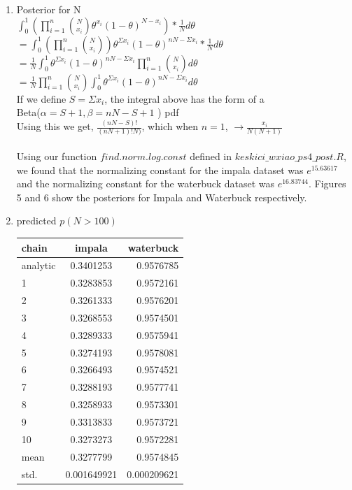 \documentclass[paper=a4, fontsize=11pt]{scrartcl}
\newcommand{\parens}[1]{ \left( #1 \right) }
\begin{document}
\begin{enumerate}
\begin{enumerate}[1]
	\item Posterior for N\\
	$\int^1_0 \parens{\prod_{i=1}^n\binom{N}{x_i}\theta^{x_i}(1-\theta)^{N - x_i}}* \frac{1}{N} d\theta$\\
	$=\int^1_0 \parens{\prod_{i=1}^n\binom{N}{x_i}}\theta^{\Sigma x_i}(1-\theta)^{nN - \Sigma x_i}* \frac{1}{N} d\theta$\\
	$= \frac{1}{N} \int^1_0 \theta^{\Sigma x_i}(1-\theta)^{nN - \Sigma x_i}\prod_{i=1}^n\binom{N}{x_i} d\theta$\\
	$= \frac{1}{N} \prod_{i=1}^n\binom{N}{x_i}  \int^1_0 \theta^{\Sigma x_i}(1-\theta)^{nN - \Sigma x_i}d\theta$\\
	If we define $S = \Sigma x_i$, the integral above has the form of a\\ 
	Beta($\alpha=S+1, \beta=nN - S + 1$ ) pdf\\
	Using this we get, $\frac{(nN-S)!}{(nN + 1)!N)}$, which when $n=1$, $\rightarrow \frac{x_i}{N(N+1)}$\\\\
	Using our function $find.norm.log.const$ defined in $keskici\_wxiao\_ps4\_post.R$, we found that the normalizing constant for the impala dataset was $e^{15.63617}$ and the normalizing constant for the waterbuck dataset was $e^{16.83744}$. Figures 5 and 6 show the posteriors for Impala and Waterbuck respectively.
	
  \item predicted $p(N > 100)$ \\
    \begin{center}
      \begin{tabular}{ l | c || r }
        chain & impala & waterbuck \\
        \hline
        analytic & 0.3401253 & 0.9576785 \\ \hline
        1 & 0.3283853 & 0.9572161 \\
        2 & 0.3261333 & 0.9576201 \\
        3 & 0.3268553 & 0.9574501 \\
        4 & 0.3289333 & 0.9575941 \\
        5 & 0.3274193 & 0.9578081 \\
        6 & 0.3266493 & 0.9574521 \\
        7 & 0.3288193 & 0.9577741 \\
        8 & 0.3258933 & 0.9573301 \\
        9 & 0.3313833 & 0.9573721 \\
        10 & 0.3273273 & 0.9572281 \\ \hline
        mean & 0.3277799 & 0.9574845 \\
        std. & 0.001649921 & 0.000209621
      \end{tabular}
    \end{center}


\end{enumerate}
\end{enumerate}
\end{document}
